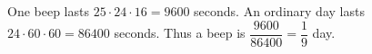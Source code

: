 One beep lasts $25\cdot24\cdot16=9600$ seconds. An ordinary day lasts $24\cdot60\cdot60=86400$ seconds. Thus a beep is $\dfrac{9600}{86400}=\boxed{\dfrac{1}{9}}$ day.

